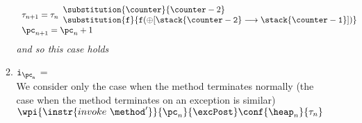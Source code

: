 \begin{enumerate}
\begin{enumerate}
$$
\begin{array}{l}
	\state{n+1} = \state{n}
			 \begin{array}{l}
		 	\substitution{ \counter }{\counter -2  } \\
			\substitution{  \tt{f} }{  \tt{f} (\oplus [ \stack{\counter - 2}  \longrightarrow  \stack{\counter  -1} ] ) }
		 \end{array} \\
		 \pc_{n+1} = \pc_n +1 
\end{array}
$$
\textit{and so this case holds}

	\item $\tt{i_{\pc_n}}$ =  \\
		We consider only the case when the method terminates normally (the case when the method terminates on an exception is similar)
		$\wpi{\instr{invoke \ \method'}}{\pc_n}{\excPost} \conf{\heap_n}{\state{n}}$ \\
		 \\
		


\end{enumerate}
\end{enumerate}
